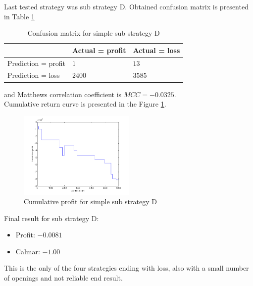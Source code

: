 \documentclass{jtacs}
\begin{document}
Last tested strategy was sub strategy D. Obtained confusion matrix is presented in Table \ref{tab4}
\begin{table}[ht]
\centering
\caption{Confusion matrix for simple sub strategy D}
\label{tab4}
\begin{tabular}{|l|l|l|}\hline
&	Actual = profit	& Actual = loss\\ \hline
Prediction = profit & $1$	& $13$ \\ \hline
Prediction = loss &	$2400$ &	$3585$ \\ \hline
\end{tabular}
\end{table}
\FloatBarrier
\noindent and Matthews correlation coefficient is $MCC=-0.0325$.\\
Cumulative return curve is presented in the Figure \ref{rys6}.
\begin{figure}[ht]
\centering
\includegraphics[width = 0.5\textwidth]{pictures/PivotPointsDp.png}
\caption{Cumulative profit for simple sub strategy D}
\label{rys6}
\end{figure}
\FloatBarrier
\noindent Final result for sub strategy D:
\begin{itemize}
\item Profit: $-0.0081$
\item Calmar: $-1.00$
\end{itemize}

This is the only of the four strategies ending with loss, also with a small number of openings and not reliable end result.\\
\end{document}
